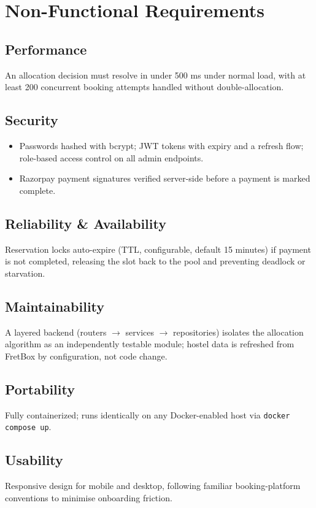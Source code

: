 \documentclass[11pt]{report}
\begin{document}
\chapter{Non-Functional Requirements}

\section{Performance}
An allocation decision must resolve in under 500 ms under normal load, with at least 200 concurrent
booking attempts handled without double-allocation.

\section{Security}
\begin{itemize}[leftmargin=1.2cm]
    \item Passwords hashed with bcrypt; JWT tokens with expiry and a refresh flow; role-based access control on all admin endpoints.
    \item Razorpay payment signatures verified server-side before a payment is marked complete.
\end{itemize}

\section{Reliability \& Availability}
Reservation locks auto-expire (TTL, configurable, default 15 minutes) if payment is not completed,
releasing the slot back to the pool and preventing deadlock or starvation.

\section{Maintainability}
A layered backend (routers $\rightarrow$ services $\rightarrow$ repositories) isolates the allocation
algorithm as an independently testable module; hostel data is refreshed from FretBox by
configuration, not code change.

\section{Portability}
Fully containerized; runs identically on any Docker-enabled host via \texttt{docker compose up}.

\section{Usability}
Responsive design for mobile and desktop, following familiar booking-platform conventions to
minimise onboarding friction.
\end{document}
